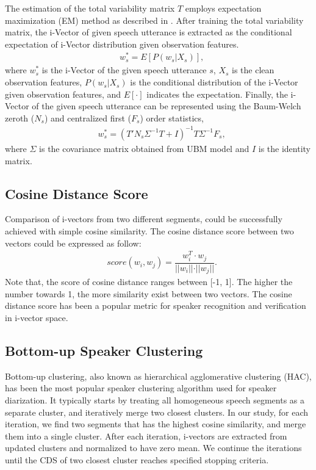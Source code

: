 \documentclass[journal]{IEEEtran}
\begin{document}
The estimation of the total variability matrix $T$ employs expectation maximization (EM) method as described in \cite{kenny2005eigenvoice}. 
After training the total variability matrix, 
the i-Vector of given speech utterance is extracted as the conditional expectation of i-Vector distribution given observation features.
\begin{equation}
\begin{aligned}
&w_{s}^{\ast}=E[P(w_{s}|X_{s})],
\label{eq:ws}
\end{aligned}
\end{equation}
where $w_{s}^{\ast}$ is the i-Vector of the given speech utterance $s$, 
$X_{s}$ is the clean observation features, 
$P(w_{s}|X_{s})$ is the conditional distribution of the i-Vector given observation features, 
and $E[\cdot]$ indicates the expectation. 
Finally, the i-Vector of the given speech utterance can be represented using the Baum-Welch zeroth ($N_s$) and centralized first ($F_s$) order statistics,
\begin{equation}
\begin{aligned}
&w_{s}^{\ast}=(T'N_{s}\Sigma^{-1}T+I)^{-1}T\Sigma^{-1}F_{s},
\label{ws2}
\end{aligned}
\end{equation}
where $\Sigma$ is the covariance matrix obtained from UBM model and $I$ is the identity matrix.

\subsection{Cosine Distance Score}
Comparison of  i-vectors from two different segments, could be successfully achieved with simple cosine similarity. The cosine distance score between two vectors could be expressed as follow:
\begin{equation}
\begin{aligned}
& score (w_i, w_j) = \dfrac{w^T_i \cdot w_j}{\rvert\rvert{w_i}\rvert\rvert \cdot \rvert\rvert{w_j}\rvert\rvert}.
\label{ws2}
\end{aligned}
\end{equation}
Note that, the score of cosine distance ranges between [-1, 1]. The higher the number towards 1, the more similarity exist between two vectors. The cosine distance score has been a popular metric for speaker recognition and verification in i-vector space.
 
\subsection{Bottom-up Speaker Clustering}
Bottom-up clustering, also known as hierarchical agglomerative clustering (HAC), has been the most popular speaker clustering algorithm used for speaker diarization. It typically starts by treating all homogeneous speech segments as a separate cluster, and iteratively merge two closest clusters. In our study, for each iteration, we find two segments that has the highest cosine similarity, and merge them into a single cluster. After each iteration, i-vectors are extracted from updated clusters and normalized to have zero mean. We continue the iterations until the CDS of two closest cluster reaches specified stopping criteria. 
\end{document}
